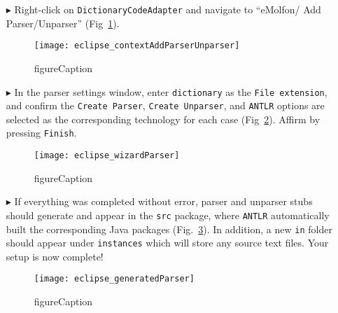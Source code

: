 \begin{itemize}

\item[$\blacktriangleright$] Right-click on \texttt{DictionaryCodeAdapter} and navigate to ``eMolfon/ Add Parser/Unparser''
(Fig~\ref{eclipse:contextParser}).

\vspace{0.5cm}

\begin{figure}[htpb]
\begin{center}
  \texttt{[image: eclipse\_contextAddParserUnparser]}
  \caption{figureCaption}
  \label{eclipse:contextParser}
\end{center}
\end{figure}


\item[$\blacktriangleright$] In the parser settings window, enter \texttt{dictionary} as the \texttt{File extension}, and confirm the \texttt{Create Parser},
\texttt{Create Unparser}, and \texttt{ANTLR} options are selected as the corresponding technology for each case (Fig~\ref{eclipse:wizardParser}). Affirm by
pressing \texttt{Finish}.

\begin{figure}[htpb]
\begin{center}
  \texttt{[image: eclipse\_wizardParser]}
  \caption{figureCaption}
  \label{eclipse:wizardParser}
\end{center}
\end{figure}

\vspace{0.5cm}

\item[$\blacktriangleright$] If everything was completed without error, parser and unparser stubs should generate and appear in the \texttt{src}
package, where \texttt{ANTLR} automatically built the corresponding Java packages (Fig.~\ref{eclipse:generatedParser}). In addition, a new
\texttt{in} folder should appear under \texttt{instances} which will store any source text files. Your setup is now complete!

\begin{figure}[htpb]
\begin{center}
  \texttt{[image: eclipse\_generatedParser]}
  \caption{figureCaption}
  \label{eclipse:generatedParser}
\end{center}
\end{figure}

\end{itemize}
